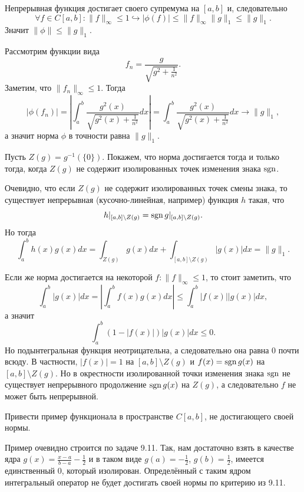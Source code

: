 \begin{solution}
    Непрерывная функция достигает своего супремума на $[a, b]$ и, следовательно
    \[
        \forall f \in C[a, b]\colon \|f\|_{\infty} \leq 1 \hookrightarrow |\phi(f)| \leq \|f\|_{\infty}\|g\|_{1} \leq \|g\|_{1}.
    \]
    Значит $\|\phi\| \leq \|g\|_{1}$.

    Рассмотрим функции вида
    \[
        f_n = \frac{g}{\sqrt{g^2 + \frac{1}{n^2}}}.
    \]
    Заметим, что $\|f_n\|_\infty \leq 1$.
    Тогда
    \[
        |\phi(f_n)| = \left|\int_a^{b} \frac{g^2(x)}{\sqrt{g^2(x) + \frac{1}{n^2}}}dx\right| = \int_a^b \frac{g^2(x)}{\sqrt{g^2(x) + \frac{1}{n^2}}}dx \rightarrow \|g\|_1,
    \]
    а значит норма $\phi$ в точности равна $\|g\|_1$.

    Пусть $Z(g) = g^{-1}(\{0\})$.
    Покажем, что норма достигается тогда и только тогда, когда $Z(g)$ не содержит изолированных точек изменения знака $\operatorname{sgn}$.

    Очевидно, что если $Z(g)$ не содержит изолированных точек смены знака, то существует непрерывная (кусочно-линейная, например) функция $h$ такая, что
    \[
        h|_{[a, b] \setminus Z(g)} = \operatorname{sgn} g|_{[a, b] \setminus Z(g)}.
    \]
    Но тогда
    \[
        \int_{a}^{b} h(x)g(x)dx = \int_{Z(g)} g(x)dx + \int_{[a, b] \setminus Z(g)} |g(x)|dx = \|g\|_1.
    \]

    Если же норма достигается на некоторой $f\colon \|f\|_\infty \leq 1$, то стоит заметить, что
    \[
        \int_{a}^{b}|g(x)|dx = \left|\int_a^b f(x)g(x)dx\right| \leq \int_{a}^{b} |f(x)||g(x)|dx,
    \]
    а значит
    \[
        \int_{a}^{b} (1 - |f(x)|)|g(x)|dx \leq 0.
    \]
    Но подынтегральная функция неотрицательна, а следовательно она равна $0$ почти всюду.
    В частности, $|f(x)| = 1$ на $[a, b] \setminus Z(g)$ и $f(x) = \operatorname{sgn} g(x)$ на $[a, b] \setminus Z(g)$.
    Но в окрестности изолированной точки изменения знака $\operatorname{sgn}$ не существует непрерывного продолжение $\operatorname{sgn} g(x)$ на $Z(g)$, а следовательно $f$ не может быть непрерывной.
\end{solution}
\begin{task}[9.4]
    Привести пример функционала в пространстве $C[a, b]$, не достигающего своей нормы.
\end{task}
\begin{solution}
    Пример очевидно строится по задаче 9.11.
    Так, нам достаточно взять в качестве ядра $g(x) = \frac{x - a}{b - a} - \frac{1}{2}$ и в таком виде $g(a) = -\frac{1}{2}$, $g(b) = \frac{1}{2}$, имеется единственный $0$, который изолирован.
    Определённый с таким ядром интегральный оператор не будет достигать своей нормы по критерию из 9.11.
\end{solution}
